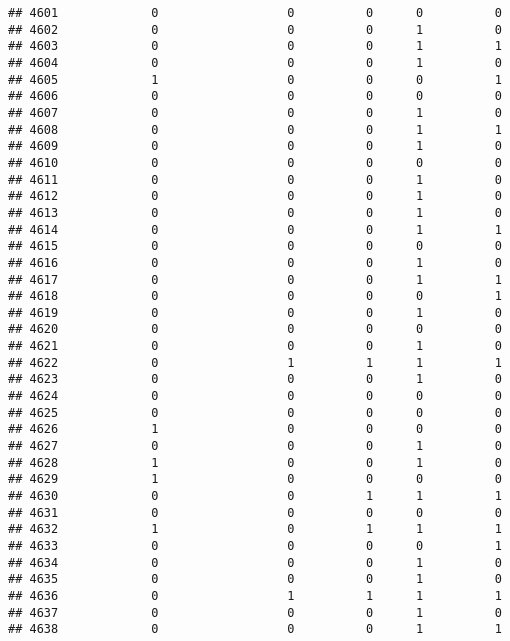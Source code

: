 \documentclass[
]{article}
\begin{document}
\begin{verbatim}
## 4601             0                  0          0      0          0
## 4602             0                  0          0      1          0
## 4603             0                  0          0      1          1
## 4604             0                  0          0      1          0
## 4605             1                  0          0      0          1
## 4606             0                  0          0      0          0
## 4607             0                  0          0      1          0
## 4608             0                  0          0      1          1
## 4609             0                  0          0      1          0
## 4610             0                  0          0      0          0
## 4611             0                  0          0      1          0
## 4612             0                  0          0      1          0
## 4613             0                  0          0      1          0
## 4614             0                  0          0      1          1
## 4615             0                  0          0      0          0
## 4616             0                  0          0      1          0
## 4617             0                  0          0      1          1
## 4618             0                  0          0      0          1
## 4619             0                  0          0      1          0
## 4620             0                  0          0      0          0
## 4621             0                  0          0      1          0
## 4622             0                  1          1      1          1
## 4623             0                  0          0      1          0
## 4624             0                  0          0      0          0
## 4625             0                  0          0      0          0
## 4626             1                  0          0      0          0
## 4627             0                  0          0      1          0
## 4628             1                  0          0      1          0
## 4629             1                  0          0      0          0
## 4630             0                  0          1      1          1
## 4631             0                  0          0      0          0
## 4632             1                  0          1      1          1
## 4633             0                  0          0      0          1
## 4634             0                  0          0      1          0
## 4635             0                  0          0      1          0
## 4636             0                  1          1      1          1
## 4637             0                  0          0      1          0
## 4638             0                  0          0      1          1

\end{verbatim}
\end{document}
